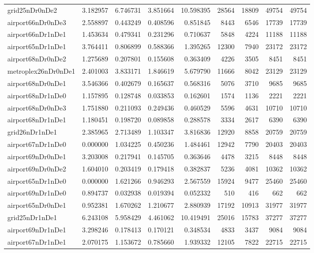 \begin{longtable}{|l|r|r|r|r|r|r|r|r|}
grid25nDr0nDe2 & 3.182957 & 6.746731 & 3.851664 & 10.598395 & 28564 & 18809 & 49754 & 49754 \\
airport66nDr0nDe3 & 2.558897 & 0.443249 & 0.408596 & 0.851845 & 8443 & 6546 & 17739 & 17739 \\
airport66nDr1nDe1 & 1.453634 & 0.479341 & 0.231296 & 0.710637 & 5848 & 4224 & 11188 & 11188 \\
airport65nDr1nDe1 & 3.764411 & 0.806899 & 0.588366 & 1.395265 & 12300 & 7940 & 23172 & 23172 \\
airport68nDr0nDe2 & 1.275689 & 0.207801 & 0.155608 & 0.363409 & 4226 & 3505 & 8451 & 8451 \\
metroplex26nDr0nDe1 & 2.401003 & 3.833171 & 1.846619 & 5.679790 & 11666 & 8042 & 23129 & 23129 \\
airport68nDr0nDe1 & 3.546366 & 0.402679 & 0.165637 & 0.568316 & 5076 & 3710 & 9685 & 9685 \\
airport68nDr1nDe0 & 1.157895 & 0.128748 & 0.033853 & 0.162601 & 1574 & 1136 & 2221 & 2221 \\
airport68nDr0nDe3 & 1.751880 & 0.211093 & 0.249436 & 0.460529 & 5596 & 4631 & 10710 & 10710 \\
airport68nDr1nDe1 & 1.180451 & 0.198720 & 0.089858 & 0.288578 & 3334 & 2617 & 6390 & 6390 \\
grid26nDr1nDe1 & 2.385965 & 2.713489 & 1.103347 & 3.816836 & 12920 & 8858 & 20759 & 20759 \\
airport67nDr1nDe0 & 0.000000 & 1.034225 & 0.450236 & 1.484461 & 12942 & 7790 & 20403 & 20403 \\
airport69nDr0nDe1 & 3.203008 & 0.217941 & 0.145705 & 0.363646 & 4478 & 3215 & 8448 & 8448 \\
airport69nDr0nDe2 & 1.604010 & 0.203419 & 0.179418 & 0.382837 & 5236 & 4081 & 10362 & 10362 \\
airport65nDr1nDe0 & 0.000000 & 1.621266 & 0.946293 & 2.567559 & 15924 & 9477 & 25460 & 25460 \\
airport69nDr1nDe0 & 0.894737 & 0.032938 & 0.019394 & 0.052332 & 510 & 416 & 662 & 662 \\
airport65nDr0nDe1 & 0.952381 & 1.670262 & 1.210677 & 2.880939 & 17192 & 10913 & 31977 & 31977 \\
grid25nDr1nDe1 & 6.243108 & 5.958429 & 4.461062 & 10.419491 & 25016 & 15783 & 37277 & 37277 \\
airport69nDr1nDe1 & 3.298246 & 0.178413 & 0.170121 & 0.348534 & 4833 & 3437 & 9084 & 9084 \\
airport67nDr1nDe1 & 2.070175 & 1.153672 & 0.785660 & 1.939332 & 12105 & 7822 & 22715 & 22715 \\

\end{longtable}
